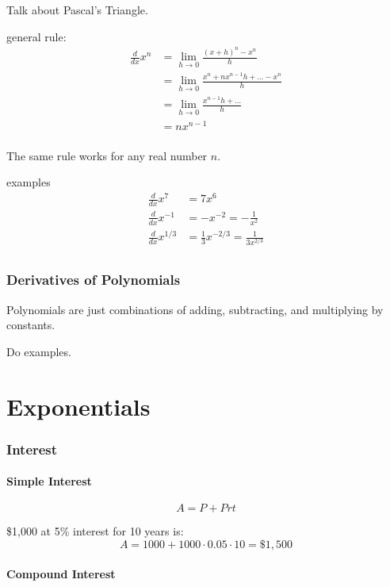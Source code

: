 \documentclass[letterpaper, landscape]{exam}
\begin{document}
  Talk about Pascal's Triangle.

  general rule:
  \begin{align*}
    \frac{d}{dx} x^n & = \lim_{h \to 0} \frac{(x + h)^n - x^n}{h} \\
                     & = \lim_{h \to 0} \frac{x^n + nx^{n - 1}h + \ldots - x^n}{h} \\
                     & = \lim_{h \to 0} \frac{x^{n - 1}h + \ldots}{h} \\
                     & = n x^{n-1} \\
  \end{align*}

  The same rule works for any real number $n$.

  examples
  \begin{align*}
    \frac{d}{dx} x^7     & = 7x^6 \\
    \frac{d}{dx} x^{-1}  & = -x^{-2} = - \frac{1}{x^2} \\
    \frac{d}{dx} x^{1/3} & = \frac{1}{3} x^{-2/3} = \frac{1}{3 x^{2/3}} \\
  \end{align*}

  \section{Derivatives of Polynomials} %
  
  Polynomials are just combinations of adding, subtracting, and multiplying by constants. 
  
  Do examples.

  \part{Exponentials} %
  
  \section{Interest}

  \subsection{Simple Interest} %
  \[
    A = P + Prt
  \]

  \$1,000 at 5\% interest for 10 years is:
  \[
    A = 1000 + 1000 \cdot 0.05 \cdot 10 = \$1,500
  \]

  \subsection{Compound Interest} %
\end{document}
